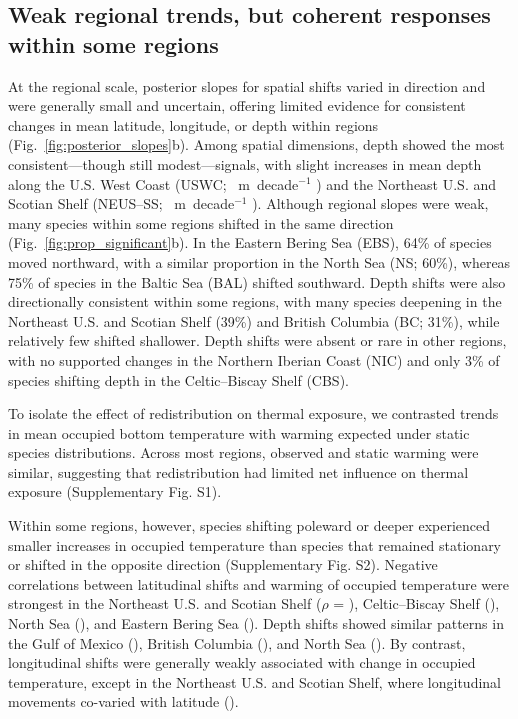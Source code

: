 \documentclass[9pt,twocolumn,twoside]{pnas-new}
\begin{document}
\subsection*{Weak regional trends, but coherent responses within some regions}



At the regional scale, posterior slopes for spatial shifts varied in direction and were generally small and uncertain, offering limited evidence for consistent changes in mean latitude, longitude, or depth within regions (Fig.~\ref{fig:posterior_slopes}b). Among spatial dimensions, depth showed the most consistent---though still modest---signals, with slight increases in mean depth along the U.S. West Coast (USWC; \DepthUSWCMedian{}~m~decade$^{-1}$ \DepthUSWCCI{}) and the Northeast U.S. and Scotian Shelf (NEUS–SS; \DepthNEUSMedian{}~m~decade$^{-1}$ \DepthNEUSCI{}). Although regional slopes were weak, many species within some regions shifted in the same direction (Fig.~\ref{fig:prop_significant}b). In the Eastern Bering Sea (EBS), 64\% of species moved northward, with a similar proportion in the North Sea (NS; 60\%), whereas 75\% of species in the Baltic Sea (BAL) shifted southward. Depth shifts were also directionally consistent within some regions, with many species deepening in the Northeast U.S. and Scotian Shelf (39\%) and British Columbia (BC; 31\%), while relatively few shifted shallower. Depth shifts were absent or rare in other regions, with no supported changes in the Northern Iberian Coast (NIC) and only 3\% of species shifting depth in the Celtic–Biscay Shelf (CBS).

To isolate the effect of redistribution on thermal exposure, we contrasted trends in mean occupied bottom temperature with warming expected under static species distributions. Across most regions, observed and static warming were similar, suggesting that redistribution had limited net influence on thermal exposure (Supplementary Fig. S1).

Within some regions, however, species shifting poleward or deeper experienced smaller increases in occupied temperature than species that remained stationary or shifted in the opposite direction (Supplementary Fig. S2). Negative correlations between latitudinal shifts and warming of occupied temperature were strongest in the Northeast U.S. and Scotian Shelf ($\rho$ = \rhocogycthermalnichecNEUS), Celtic–Biscay Shelf (\rhocogycthermalnichecCBS), North Sea (\rhocogycthermalnichecNS), and Eastern Bering Sea (\rhocogycthermalnichecEBS). Depth shifts showed similar patterns in the Gulf of Mexico (\rhodepthnichecthermalnichecGOM), British Columbia (\rhodepthnichecthermalnichecBC), and North Sea (\rhodepthnichecthermalnichecNS). By contrast, longitudinal shifts were generally weakly associated with change in occupied temperature, except in the Northeast U.S. and Scotian Shelf, where longitudinal movements co-varied with latitude (\rhocogyccogxcNEUS).
\end{document}
